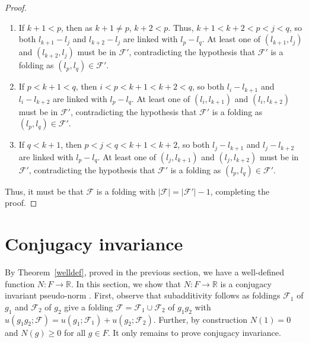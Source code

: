 \documentclass{amsart}
\theoremstyle{plain}
\theoremstyle{definition}
\theoremstyle{remark}
\newcommand{\R}{\mathbb{R}}
\newcommand{\F}{\mathcal{F}}
\begin{document}
\begin{proof}
\begin{enumerate}
\item If $k+1<p$, then as $k+1\neq p$, $k+2<p$. Thus, $k+1<k+2<p<j<q$, so both $l_{k+1}-l_j$ and $l_{k+2}-l_j$  are linked with $l_p-l_q$. At least one of $(l_{k+1},l_j)$ and $(l_{k+2},l_j)$ must be in $\F'$, contradicting the hypothesis that $\F'$ is a folding as $(l_p,l_q)\in\F'$.
\item If $p<k+1<q$, then $i<p<k+1<k+2<q$, so both $l_i-l_{k+1}$ and $l_i-l_{k+2}$  are linked with $l_p-l_q$. At least one of $(l_i,l_{k+1})$ and $(l_i,l_{k+2})$ must be in $\F'$, contradicting the hypothesis that $\F'$ is a folding as $(l_p,l_q)\in\F'$.
\item If $q<k+1$, then $p<j<q<k+1<k+2$, so both $l_j-l_{k+1}$ and $l_j-l_{k+2}$  are linked with $l_p-l_q$. At least one of $(l_j,l_{k+1})$ and $(l_j,l_{k+2})$ must be in $\F'$, contradicting the hypothesis that $\F'$ is a folding as $(l_p,l_q)\in\F'$.
\end{enumerate}

Thus, it must be that $\F$ is a folding with $\vert \F\vert=\vert\F'\vert-1$, completing the proof.
 
\end{proof}

\section{Conjugacy invariance}

By Theorem~\ref{welldef}, proved in the previous section, we have a well-defined function $N:F\to\R$. In this section, we show that $N:F\to\R$ is a conjugacy invariant   pseudo-norm . First, observe that subadditivity follows as foldings $\F_1$ of $g_1$ and $\F_2$ of $g_2$ give a folding $\F=\F_1\cup \F_2$ of $g_1g_2$ with  $u(g_1g_2;\F)=u(g_1;\F_1)+u(g_2;\F_2)$. Further, by construction $N(1)=0$ and $N(g)\geq 0$ for all $g\in F$. It only remains to prove conjugacy invariance.
\end{document}

